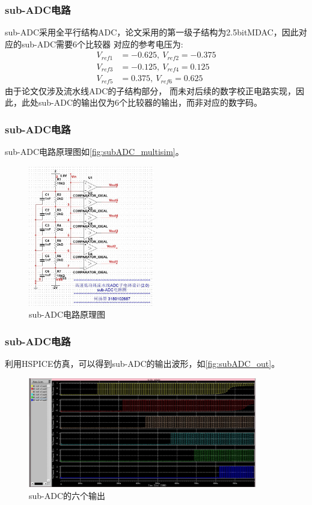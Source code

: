 \documentclass[10pt, mathserif]{beamer}	%
\newcommand{\ftitle}[1]{\frametitle{#1}}	%
\begin{document}
	\begin{frame}
		\ftitle{sub-ADC电路}
		sub-ADC采用全平行结构ADC，论文采用的第一级子结构为2.5bitMDAC，因此对应的sub-ADC需要6个比较器
		对应的参考电压为:
		\begin{align*}
			V_{ref1} & = -0.625,\ V_{ref2} = -0.375 \\
			V_{ref3} & = -0.125, \ V_{ref4} = 0.125 \\
			V_{ref5} & = 0.375,\ V_{ref6} = 0.625 
		\end{align*}
		由于论文仅涉及流水线ADC的子结构部分，
    	而未对后续的数字校正电路实现，因此，此处sub-ADC的输出仅为6个比较器的输出，而非对应的数字码。
	\end{frame}

	\begin{frame}
		\ftitle{sub-ADC电路}
		\par sub-ADC电路原理图如\autoref{fig:subADC_multisim}。
		\begin{figure}[H]
			\centering
			\includegraphics[width=5.5cm]{subADC_multisim}
			\caption{\label{fig:subADC_multisim}sub-ADC电路原理图}
		\end{figure}		
	\end{frame}

	\begin{frame}
		\ftitle{sub-ADC电路}
		\par 利用HSPICE仿真，可以得到sub-ADC的输出波形，如\autoref{fig:subADC_out}。
		\begin{figure}[H]
			\centering
			\includegraphics[width=10cm]{subADC_out}
			\caption{\label{fig:subADC_out}sub-ADC的六个输出}
		\end{figure}	
	\end{frame}
\end{document}
